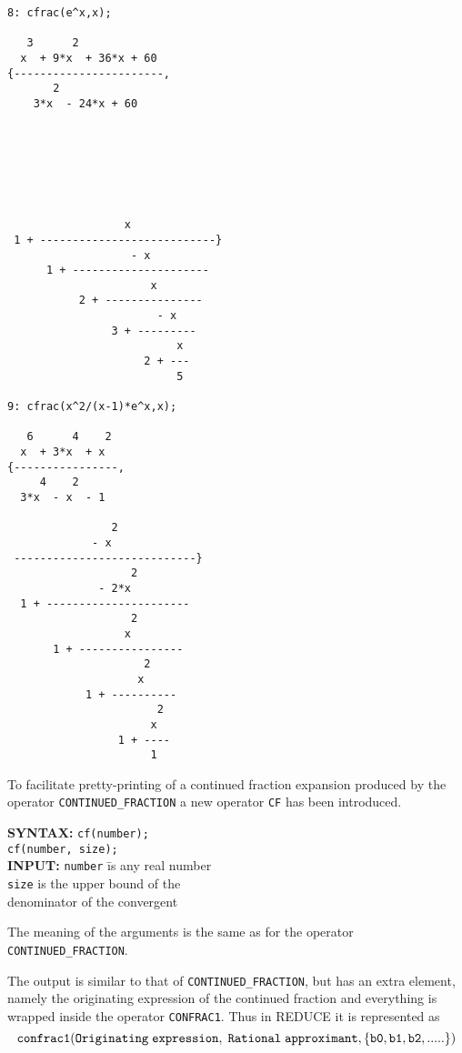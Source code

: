 \begin{verbatim}
8: cfrac(e^x,x);

   3      2
  x  + 9*x  + 36*x + 60
{-----------------------,
       2
    3*x  - 24*x + 60







                  x
 1 + ---------------------------}
                   - x
      1 + ---------------------
                      x
           2 + ---------------
                       - x
                3 + ---------
                          x
                     2 + ---
                          5

9: cfrac(x^2/(x-1)*e^x,x);

   6      4    2
  x  + 3*x  + x
{----------------,
     4    2
  3*x  - x  - 1

                2
             - x
 ----------------------------}
                   2
              - 2*x
  1 + ----------------------
                   2
                  x
       1 + ----------------
                     2
                    x
            1 + ----------
                       2
                      x
                 1 + ----
                      1

\end{verbatim}

To facilitate pretty-printing of a continued fraction expansion produced
by the operator
\texttt{CONTINUED\_FRACTION} a new operator \texttt{CF} has been
introduced.

\begin{tabbing}
{\bf SYNTAX:} \hspace{5mm} 
\= {\tt cf(number);}\\
\> {\tt cf(number, size);}\\ 

{\bf INPUT:}
\> {\tt number} \hspace{3mm} \= is any real number\\
\> {\tt size}              \> is the upper bound of the \\ 
\>                           \> denominator of the convergent \\ 
\end{tabbing}
The meaning of the arguments is the same as for the operator
\texttt{CONTINUED\_FRACTION}.

The output is similar to that of \texttt{CONTINUED\_FRACTION}, but
has an extra element, namely the originating expression of the
continued fraction and everything is wrapped inside the operator
\texttt{CONFRAC1}. Thus in {\small REDUCE} it is represented as
\[{\tt
  confrac1({\sl Originating\hspace{1mm} expression,\hspace{1mm}
            Rational\hspace{1mm} approximant},
                \{b0, b1, b2,.....\})
}\]

